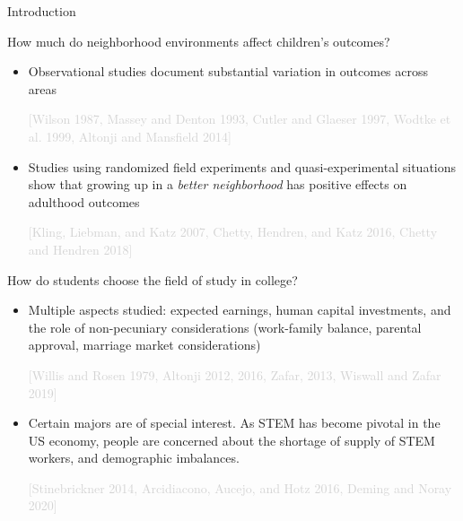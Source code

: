 \documentclass[aspectratio=169,xcolor=dvipsnames]{beamer}
\newenvironment{wideitemize}{\itemize\addtolength{\itemsep}{10pt}}{\enditemize}
\begin{document}
\begin{frame}{Introduction}

\begin{wideitemize}
  \item How much do neighborhood environments affect children’s outcomes?
    \begin{itemize}
        \item Observational studies document substantial variation in outcomes across areas \begin{scriptsize} \textcolor{lightgray}{[Wilson 1987, Massey and Denton 1993, Cutler and Glaeser 1997, Wodtke et al. 1999, Altonji and Mansfield 2014]}\end{scriptsize}
        \item Studies using randomized field experiments and quasi-experimental situations show that growing up in a \textit{better neighborhood} has positive effects on adulthood outcomes \begin{scriptsize} \textcolor{lightgray}{[Kling, Liebman, and Katz 2007, Chetty, Hendren, and Katz 2016, Chetty and Hendren 2018]}\end{scriptsize}
    \end{itemize}
    \item How do students choose the field of study in college?
    \begin{itemize}
        \item Multiple aspects studied: expected earnings, human capital investments, and the role of non-pecuniary considerations (work-family balance, parental approval, marriage market considerations) \begin{scriptsize} \textcolor{lightgray}{[Willis and Rosen 1979, Altonji 2012, 2016, Zafar, 2013, Wiswall and Zafar 2019]}\end{scriptsize}
        \item Certain majors are of special interest. As STEM has become pivotal in the US economy, people are concerned about the shortage of supply of STEM workers, and demographic imbalances. \begin{scriptsize} \textcolor{lightgray}{[Stinebrickner 2014, Arcidiacono, Aucejo, and Hotz 2016, Deming and Noray 2020]}\end{scriptsize}
    \end{itemize}
\end{wideitemize}
\end{frame}
\end{document}
